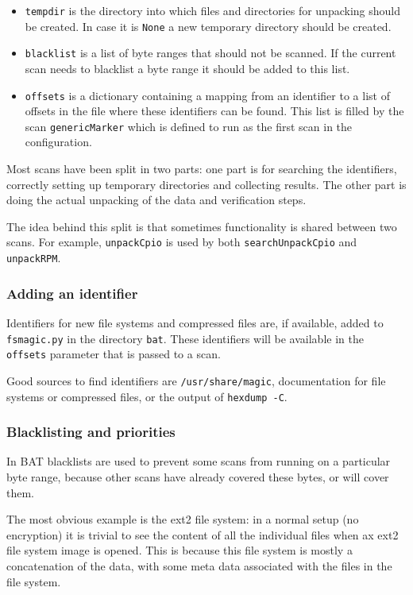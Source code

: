 \documentclass[10pt]{article}
\begin{document}
\begin{itemize}
\item \texttt{tempdir} is the directory into which files and directories for
unpacking should be created. In case it is \texttt{None} a new temporary
directory should be created.
\item \texttt{blacklist} is a list of byte ranges that should not be scanned.
If the current scan needs to blacklist a byte range it should be added to this
list.
\item \texttt{offsets} is a dictionary containing a mapping from an identifier
to a list of offsets in the file where these identifiers can be found. This
list is filled by the scan \texttt{genericMarker} which is defined to run as
the first scan in the configuration.
\end{itemize}

Most scans have been split in two parts: one part is for searching the
identifiers, correctly setting up temporary directories and collecting results.
The other part is doing the actual unpacking of the data and verification
steps.

The idea behind this split is that sometimes functionality is shared between
two scans. For example, \texttt{unpackCpio} is used by both
\texttt{searchUnpackCpio} and \texttt{unpackRPM}.

\subsubsection{Adding an identifier}

Identifiers for new file systems and compressed files are, if available, added
to \texttt{fsmagic.py} in the directory \texttt{bat}. These identifiers will be
available in the \texttt{offsets} parameter that is passed to a scan.

Good sources to find identifiers are \texttt{/usr/share/magic}, documentation
for file systems or compressed files, or the output of \texttt{hexdump -C}.

\subsubsection{Blacklisting and priorities}

In BAT blacklists are used to prevent some scans from running on a particular
byte range, because other scans have already covered these bytes, or will cover
them.

The most obvious example is the ext2 file system: in a normal setup (no
encryption) it is trivial to see the content of all the individual files when
ax ext2 file system image is opened. This is because this file system is
mostly a concatenation of the data, with some meta data associated with the
files in the file system.
\end{document}
